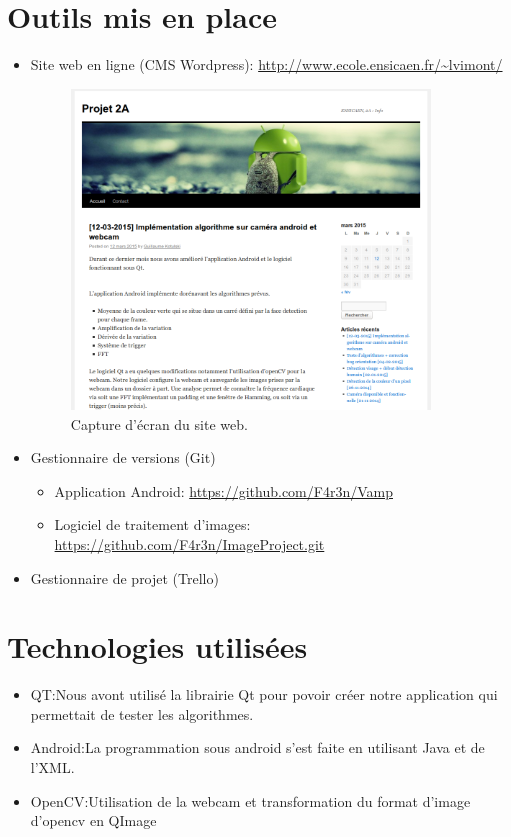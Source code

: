\section{Outils mis en place}

\begin{itemize}
	\item Site web en ligne (CMS Wordpress): \url{http://www.ecole.ensicaen.fr/~lvimont/} 

		\begin{figure}[h!]
			\centering
			\includegraphics[width=0.9\textwidth]{data/website.png}
			\caption{Capture d'écran du site web.}
		\end{figure}

	\item Gestionnaire de versions (Git) 
		\begin{itemize}[label=\textbullet]
			\item Application Android: \url{https://github.com/F4r3n/Vamp} 
			\item Logiciel de traitement d'images: \url{https://github.com/F4r3n/ImageProject.git} 
		\end{itemize}
	\item Gestionnaire de projet (Trello)
\end{itemize}

\section{Technologies utilisées}

\begin{itemize}[label=\textbullet]
	\item QT:Nous avont utilisé la librairie Qt pour povoir créer notre application qui permettait de tester les algorithmes.
	\item Android:La programmation sous android s'est faite en utilisant Java et de l'XML.
	\item OpenCV:Utilisation de la webcam et transformation du format d'image d'opencv en QImage
\end{itemize}

